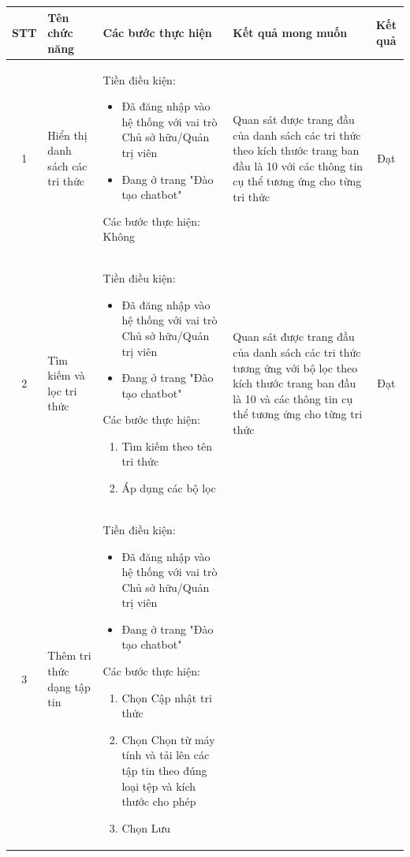 
\begin{longtable}{|c|m{2.5cm}|m{5.5cm}|m{4.5cm}|c|}
    \hline
    \textbf{STT} & \textbf{Tên chức năng} & \textbf{Các bước thực hiện} & \textbf{Kết quả mong muốn} & \textbf{Kết quả} \\
    \hline
    1 & 
    Hiển thị danh sách các tri thức & 
    Tiền điều kiện:
    \begin{itemize}
        \item Đã đăng nhập vào hệ thống với vai trò Chủ sở hữu/Quản trị viên
        \item Đang ở trang "Đào tạo chatbot"
    \end{itemize}
    Các bước thực hiện: Không
    & 
    Quan sát được trang đầu của danh sách các tri thức theo kích thước trang ban đầu là 10 với các thông tin cụ thể tương ứng cho từng tri thức& Đạt \\
    \hline
    2 & 
    Tìm kiếm và lọc tri thức & 
    Tiền điều kiện:
    \begin{itemize}
        \item Đã đăng nhập vào hệ thống với vai trò Chủ sở hữu/Quản trị viên
        \item Đang ở trang "Đào tạo chatbot"
    \end{itemize}
    Các bước thực hiện: 
    \begin{enumerate}[label=\arabic*.]
        \item Tìm kiếm theo tên tri thức
        \item Áp dụng các bộ lọc
    \end{enumerate}
    & 
    Quan sát được trang đầu của danh sách các tri thức tương ứng với bộ lọc theo kích thước trang ban đầu là 10 và các thông tin cụ thể tương ứng cho từng tri thức & Đạt \\
    \hline
    3 & 
    Thêm tri thức dạng tập tin& 
    Tiền điều kiện:
    \begin{itemize}
        \item Đã đăng nhập vào hệ thống với vai trò Chủ sở hữu/Quản trị viên
        \item Đang ở trang "Đào tạo chatbot"
    \end{itemize}
    Các bước thực hiện: 
    \begin{enumerate}[label=\arabic*.]
        \item Chọn Cập nhật tri thức
        \item Chọn Chọn từ máy tính và tải lên các tập tin theo đúng loại tệp và kích thước cho phép
        \item Chọn Lưu

\end{enumerate}
\end{longtable}

